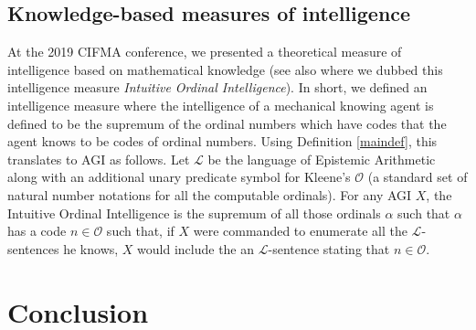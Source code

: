 \documentclass[runningheads]{llncs}
\begin{document}
\subsection{Knowledge-based measures of intelligence}

At the 2019 CIFMA conference, we presented \cite{alexander2019measuring}
a theoretical measure of intelligence based on mathematical knowledge
(see also \cite{alexander2020agi} where we dubbed this intelligence
measure \emph{Intuitive Ordinal Intelligence}).
In short, we defined an intelligence measure where the intelligence of
a mechanical knowing agent is defined to be the supremum of the
ordinal numbers which have codes that the agent knows to be codes
of ordinal numbers. Using Definition \ref{maindef}, this translates
to AGI as follows. Let $\mathscr L$ be the language of Epistemic Arithmetic
along with an additional unary predicate symbol for Kleene's $\mathcal O$
(a standard set of natural number notations for all the computable
ordinals). For any AGI $X$, the Intuitive Ordinal Intelligence is the
supremum of all those ordinals $\alpha$ such that $\alpha$ has a code
$n\in\mathcal O$ such that, if $X$ were commanded to enumerate all the
$\mathscr L$-sentences he knows, $X$ would include the an $\mathscr L$-sentence
stating that $n\in\mathcal O$.


\section{Conclusion}
\label{conclusionsection}



\end{document}
